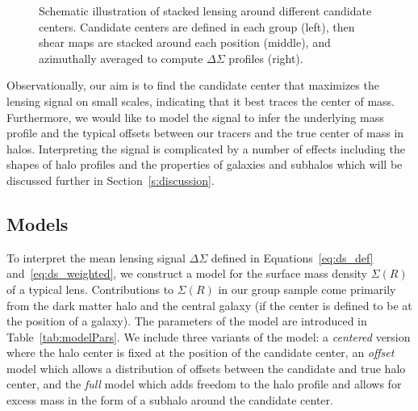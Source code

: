 \documentclass[12pt]{emulateapj}
\begin{document}
\begin{figure*}[htb]
\caption{Schematic illustration of stacked lensing around different
  candidate centers. Candidate centers are defined in each group
  (left), then shear maps are stacked around each position (middle), and
azimuthally averaged to compute $\Delta\Sigma$ profiles (right).}
\label{fig:cartoon}
\end{figure*}

Observationally, our aim is to find the candidate center that
maximizes the lensing signal on small scales, indicating that it best
traces the center of mass. Furthermore, we would like to model the
signal to infer the underlying mass profile and the typical offsets
between our tracers and the true center of mass in halos. Interpreting
the signal is complicated by a number of effects including the shapes
of halo profiles and the properties of galaxies and subhalos which
will be discussed further in Section~\ref{s:discussion}.


\subsection{Models}

To interpret the mean lensing signal $\Delta\Sigma$ defined in
Equations~\eqref{eq:ds_def} and~\eqref{eq:ds_weighted}, we construct a
model for the surface mass density $\Sigma(R)$ of a typical
lens. Contributions to $\Sigma(R)$ in our group sample come primarily from
the dark matter halo and the central galaxy (if the center is defined
to be at the position of a galaxy). The parameters of the model are introduced in
  Table~\ref{tab:modelPars}. We include three variants of the model: a
\textit{centered} version where the halo center is fixed at the position of the
candidate center, an \textit{offset} model which allows a distribution
of offsets between the candidate and true halo center, and the
\textit{full} model which adds freedom to the halo profile and allows
for excess mass in the form of a subhalo around the candidate center.
\end{document}

